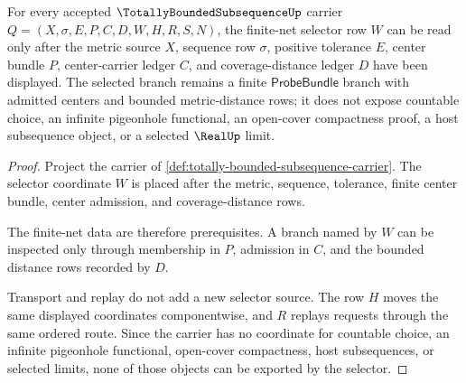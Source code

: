 \begin{theorem}
\label{thm:totally-bounded-subsequence-finite-net-selector}
For every accepted $\TotallyBoundedSubsequenceUp$ carrier $Q=(X,\sigma,E,P,C,D,W,H,R,S,N)$, the finite-net selector row $W$ can be read only after the metric source $X$, sequence row $\sigma$, positive tolerance $E$, center bundle $P$, center-carrier ledger $C$, and coverage-distance ledger $D$ have been displayed. The selected branch remains a finite $\mathsf{ProbeBundle}$ branch with admitted centers and bounded metric-distance rows; it does not expose countable choice, an infinite pigeonhole functional, an open-cover compactness proof, a host subsequence object, or a selected $\RealUp$ limit.
\end{theorem}
\begin{proof}
Project the carrier of \autoref{def:totally-bounded-subsequence-carrier}. The selector coordinate $W$ is placed after the metric, sequence, tolerance, finite center bundle, center admission, and coverage-distance rows.

The finite-net data are therefore prerequisites. A branch named by $W$ can be inspected only through membership in $P$, admission in $C$, and the bounded distance rows recorded by $D$.

Transport and replay do not add a new selector source. The row $H$ moves the same displayed coordinates componentwise, and $R$ replays requests through the same ordered route. Since the carrier has no coordinate for countable choice, an infinite pigeonhole functional, open-cover compactness, host subsequences, or selected limits, none of those objects can be exported by the selector.
\end{proof}

